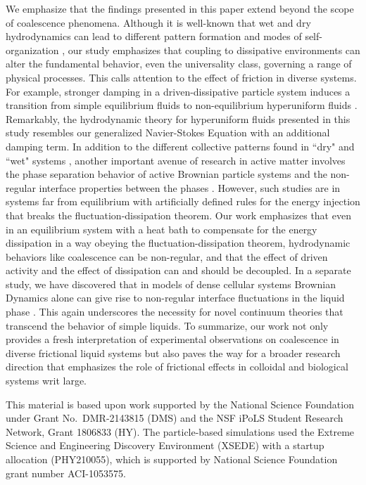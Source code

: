 \documentclass[%
reprint,
amsmath,amssymb,
aps,
]{revtex4-2}
\begin{document}
	
	We emphasize that the findings presented in this paper extend beyond the scope of coalescence phenomena. Although it is well-known that wet and dry hydrodynamics can lead to different pattern formation and modes of self-organization \cite{marchetti2013hydrodynamics}, our study emphasizes that coupling to dissipative environments can alter the fundamental behavior, even the universality class, governing a range of physical processes. This calls attention to the effect of friction in diverse systems. For example, stronger damping in a driven-dissipative particle system induces a transition from simple equilibrium fluids to non-equilibrium hyperuniform fluids \cite{lei2019hydrodynamics}. Remarkably, the hydrodynamic theory for hyperuniform fluids presented in this study resembles our generalized Navier-Stokes Equation with an additional damping term. In addition to the different collective patterns found in ``dry" and ``wet" systems \cite{doostmohammadi2016stabilization}, another important avenue of research in active matter involves the phase separation behavior of active Brownian particle systems and the non-regular interface properties between the phases \cite{bialke2015negative}. However, such studies are in systems far from equilibrium with artificially defined rules for the energy injection that breaks the fluctuation-dissipation theorem. Our work emphasizes that even in an equilibrium system with a heat bath to compensate for the energy dissipation in a way obeying the fluctuation-dissipation theorem, hydrodynamic behaviors like coalescence can be non-regular, and that the effect of driven activity and the effect of dissipation can and should be decoupled. In a separate study, we have discovered that in models of dense cellular systems Brownian Dynamics alone can give rise to non-regular interface fluctuations in the liquid phase \cite{YueInPrep2023}. This again underscores the necessity for novel continuum theories that transcend the behavior of simple liquids. To summarize, our work not only provides a fresh interpretation of experimental observations on coalescence in diverse frictional liquid systems but also paves the way for a broader research direction that emphasizes the role of frictional effects in colloidal and biological systems writ large.
	
	
	
	\begin{acknowledgments}
		This material is based upon work supported by the National Science Foundation under Grant No.~DMR-2143815 (DMS) and the  NSF iPoLS Student Research Network, Grant 1806833 (HY). The particle-based simulations used the Extreme Science and Engineering Discovery Environment (XSEDE) with a startup allocation (PHY210055), which is supported by National Science Foundation grant number ACI-1053575.
	\end{acknowledgments}
	
\end{document}
